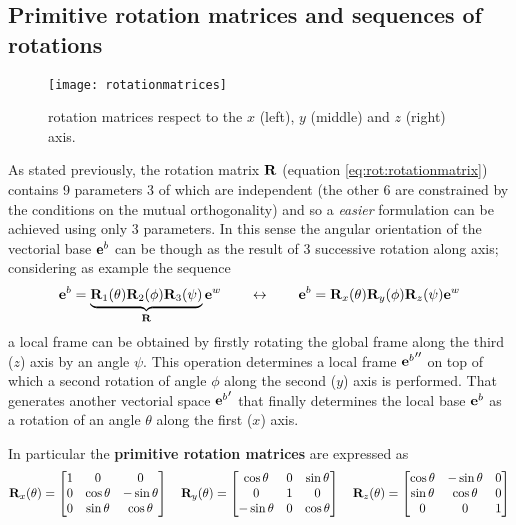 	\subsection{Primitive rotation matrices and sequences of rotations}	
		
		\begin{figure}[bt]
			\centering \texttt{[image: rotationmatrices]}
			\caption{rotation matrices respect to the $x$ (left), $y$ (middle) and $z$ (right) axis.}
		\end{figure}
	
		As stated previously, the rotation matrix $\mathbf{R}$ (equation \ref{eq:rot:rotationmatrix}) contains 9 parameters 3 of which are independent (the other 6 are constrained by the conditions on the mutual orthogonality) and so a \textit{easier} formulation can be achieved using only 3 parameters. In this sense the angular orientation of the vectorial base $\mathbf{e}^b$ can be though as the result of 3 successive rotation along axis; considering as example the sequence
		\[  \mathbf{e}^b = \underbrace{\mathbf{R}_1(\theta) \mathbf{R}_2(\phi) \mathbf{R}_3(\psi) }_{\mathbf{R}} \mathbf{e}^w \qquad \leftrightarrow \qquad \mathbf{e}^b = \mathbf{R}_x(\theta) \mathbf{R}_y(\phi) \mathbf{R}_z(\psi) \mathbf{e}^w \]
		a local frame can be obtained by firstly rotating the global frame along the third ($z$) axis by an angle $\psi$. This operation determines a local frame ${\mathbf{e}^b}''$ on top of which a second rotation of angle $\phi$ along the second ($y$) axis is performed. That generates another vectorial space ${\mathbf{e}^b}'$ that finally determines the local base $\mathbf{e}^b$ as a rotation of an angle $\theta$ along the first ($x$) axis.
		
		In particular the \textbf{primitive rotation matrices} are expressed as
		\begin{equation}
			\mathbf{R}_x(\theta) = \begin{bmatrix}  1 & 0 & 0 \\ 0 & \cos\theta &-\sin\theta \\ 0 & \sin\theta &\cos\theta  \end{bmatrix} \quad 
			\mathbf{R}_y(\theta) = \begin{bmatrix}  \cos\theta & 0 & \sin\theta \\ 0 & 1 & 0 \\ -\sin\theta & 0 & \cos\theta  \end{bmatrix} \quad 
			\mathbf{R}_z(\theta) = \begin{bmatrix}  \cos\theta & - \sin\theta & 0 \\ \sin\theta & \cos\theta & 0 \\ 0 & 0 & 1  \end{bmatrix} 
		\end{equation}
		
